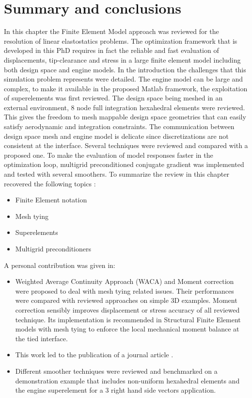 \section{Summary and conclusions}      
In this chapter the Finite Element Model approach was reviewed for the resolution of linear elastostatics problems. The optimization framework that is developed in this PhD requires in fact the reliable and fast evaluation of displacements, tip-clearance and stress in a large finite element model including both design space and engine models. In the introduction the challenges that this simulation problem represents were detailed.  The engine model can be large and complex, to make it available in the proposed Matlab framework, the exploitation of superelements was first reviewed. The design space being meshed in an external environment, 8 node full integration hexahedral elements were reviewed. This gives the freedom to mesh mappable design space geometries that can easily satisfy aerodynamic and integration constraints. The communication between design space mesh and engine model is delicate since discretizations are not consistent at the interface. Several techniques were reviewed and compared with  a proposed one. To make the evaluation of model responses faster in the optimization loop, multigrid preconditioned conjugate gradient was implemented and tested with several smoothers. To summarize the review in this chapter recovered the following topics :
\begin{itemize}
\item Finite Element notation
\item Mesh tying
\item Superelements
\item Multigrid preconditioners
\end{itemize}
A personal contribution was given in:
\begin{itemize}
\item Weighted Average Continuity Approach (WACA) and Moment correction were proposed to deal with mesh tying related issues. Their performances were compared with reviewed approaches on simple 3D examples. Moment correction sensibly improves displacement or stress accuracy of all reviewed technique. Its implementation is recommended in Structural Finite Element models with mesh tying to enforce the local mechanical moment balance at the tied interface. 
\item This work led to the publication of a journal article \cite{coniglio2018weighted}.
\item Different smoother techniques were reviewed and benchmarked on a  demonstration example that includes non-uniform hexahedral elements and the engine superelement for a 3 right hand side vectors application.
\end{itemize}
